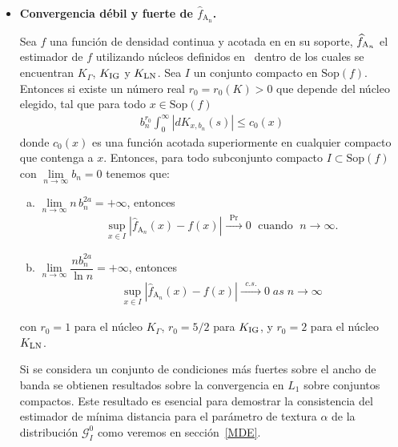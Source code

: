 \begin{itemize}
	\item \textbf{Convergencia débil y fuerte de $\widehat{f}_{\text{A}_\text{n}}$.} 
\begin{theorem}
	Sea $f$ una función de densidad continua y acotada en en su soporte, $\widehat{f}_{\tiny \text{A}_n}$ el estimador de $f$ utilizando núcleos definidos en~\cite{Libnegue2013} dentro de los cuales se encuentran $K_{\Gamma}$, $K_{\tiny \text{IG}}$ y $K_{\tiny \text{LN}}$. Sea $I$ un conjunto compacto en $\mathrm{Sop}(f)$. Entonces si existe un número real $r_0=r_0(K)>0$ que depende del núcleo elegido, tal que para todo $x \in \mathrm{Sop}(f)$ 
	\begin{align}
	b_n^{r_0} \displaystyle{\int_0^{\infty}} | dK_{x,b_n}(s) | \leq c_0(x)
	\end{align}
	donde $c_0(x)$ es una función acotada superiormente en cualquier compacto que contenga a $x$. Entonces, para todo subconjunto compacto $I \subset \mathrm{Sop}(f)$ con $\lim\limits_{n \rightarrow \infty} b_n=0 $ tenemos que:
	\begin{enumerate}[a)]
		\item $\lim\limits_{n \rightarrow \infty} n \, b_n^{2a}=+\infty$,  entonces
		\begin{align}
		\sup_{x \in I} |\widehat{f}_{\text{A}_n}(x)-f(x)|\xrightarrow{\;\; \Pr \;\; }0 \; \text{ cuando } \; n \rightarrow \infty.
		\label{convergenciaProb} 
		\end{align}
		\item $\lim\limits_{n \to \infty} \dfrac{n b_n^{2a}}{\ln{n}}  = +\infty $, entonces 
		\begin{align}
		\sup_{x \in I} |\widehat{f}_{\text{A}_n}(x)-f(x)|\xrightarrow{\;\; c.s. \;\; }0 \; as \; n \rightarrow \infty 
		\label{convergencia.a.s.}
		\end{align}
	\end{enumerate}
con $r_0=1$ para el núcleo $K_{\Gamma}$, $r_0=5/2$ para $K_{\tiny \text{IG}}$, y $r_0=2$ para el núcleo $K_{\tiny \text{LN}}$. 
\end{theorem}

Si se considera un conjunto de condiciones más fuertes sobre el ancho de banda se obtienen resultados sobre la convergencia en $L_1$ sobre conjuntos compactos. Este resultado es esencial para demostrar la consistencia del estimador de mínima distancia para el parámetro de textura $\alpha$ de la distribución $\mathcal{G}_I^0$ como veremos en sección~\ref{MDE}.


\end{itemize}
